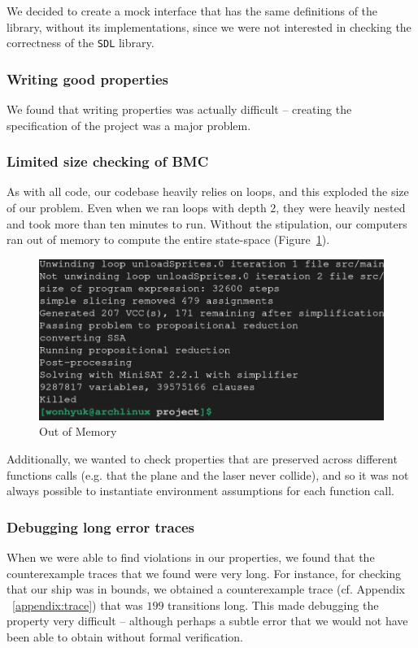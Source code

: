 \documentclass{article}
\begin{document}
We decided to create a mock interface that has the same definitions of the library, without its implementations,
since we were not interested in checking the correctness of the \texttt{SDL} library.

\subsubsection{Writing good properties}
We found that writing properties was actually difficult -- creating the specification of the project was a major problem.


\subsubsection{Limited size checking of BMC}
As with all code, our codebase heavily relies on loops, and this exploded the size of our problem.
Even when we ran loops with depth $2$, they were heavily nested and took more than ten minutes to run.
Without the stipulation, our computers ran out of memory to compute the entire state-space (Figure~\ref{fig:killed}).
\begin{figure}[h!]
    \includegraphics[width=\linewidth]{killed.png}
    \caption{Out of Memory}
    \label{fig:killed}
\end{figure}

Additionally, we wanted to check properties that are preserved across different functions calls (e.g. that the plane and the laser never collide), and so it was not always possible to instantiate environment assumptions for each function call.


\subsubsection{Debugging long error traces}
When we were able to find violations in our properties, we found that the counterexample traces that we found were very long.
For instance, for checking that our ship was in bounds, we obtained a counterexample trace (cf. Appendix ~\ref{appendix:trace}) that was $199$ transitions long.
This made debugging the property very difficult -- although perhaps a subtle error that we would not have been able to obtain without formal verification.
\end{document}
